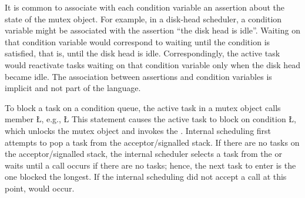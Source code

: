 \documentclass[openright,twoside]{report}
\begin{document}
\begin{annotation}
It is common to associate with each condition variable an assertion about the state of the mutex object.
For example, in a disk-head scheduler, a condition variable might be associated with the assertion ``the disk head is idle''.
Waiting on that condition variable would correspond to waiting until the condition is satisfied, that is, until the disk head is idle.
Correspondingly, the active task would reactivate tasks waiting on that condition variable only when the disk head became idle.
The association between assertions and condition variables is implicit and not part of the language.
\end{annotation}

To block a task on a condition queue, the active task in a mutex object calls member \LGinlinetrue\LGbegin\lgrinde\L{}\endlgrinde\LGend{}, e.g.,
\LGinlinefalse\LGbegin\lgrinde
\L{}
\endlgrinde\LGend
This statement causes the active task to block on condition \LGinlinetrue\LGbegin\lgrinde\L{}\endlgrinde\LGend{}, which unlocks the mutex object and invokes the .
Internal scheduling first attempts to pop a task from the acceptor/signalled stack.
If there are no tasks on the acceptor/signalled stack, the internal scheduler selects a task from the  or waits until a call occurs if there are no tasks;
hence, the next task to enter is the one blocked the longest.
If the internal scheduling did not accept a call at this point,  would occur.
\end{document}
